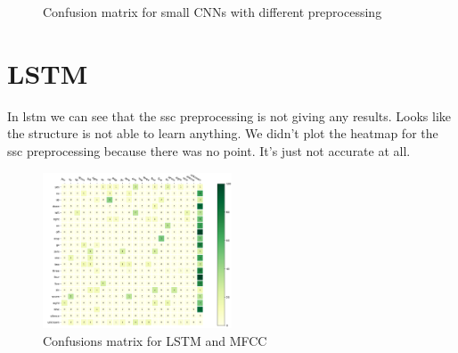 \begin{figure}[h!]

    \centering
    \qquad
    \caption{Confusion matrix for small CNNs with different preprocessing}
    \label{fig:confusion_small}

\end{figure}


\section{LSTM}




In lstm we can see that the ssc preprocessing is not giving any results. Looks like the structure is not able to learn anything. We didn't plot the heatmap for the ssc preprocessing because there was no point. It's just not accurate at all.

\begin{figure}[h!]
    \centering
    \includegraphics[width=0.5\textwidth]{chapters/pictures/lstm_matrix_mfcc.PNG}
    \caption{Confusions matrix for LSTM and MFCC}
    \label{fig:matrix_lstm_mfcc}
\end{figure}

